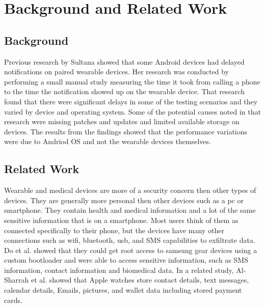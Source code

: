 \section{Background and Related Work}
\subsection{Background}
Previous research by Sultana\cite{sultana_wearable_nodate} showed that some Android devices had delayed notifications on paired wearable devices. 
Her research was conducted by performing a small manual study measuring the time it took from calling a phone to the time the notification showed up on the wearable device.
That research found that there were significant delays in some of the testing scenarios and they varied by device and operating system.
Some of the potential causes noted in that research were missing patches and updates and limited available storage on devices.
The results from the findings showed that the performance variations were due to Andriod OS and not the wearable devices themselves.

\subsection{Related Work}
Wearable and medical devices are more of a security concern then other types of devices. 
They are generally more personal then other devices such as a pc or smartphone. 
They contain health and medical information and a lot of the same sensitive information that is on a smartphone. 
Most users think of them as connected specifically to their phone, but the devices have many other connections such as wifi, bluetooth, usb, and SMS capabilities to exfiltrate data.
Do et al. showed that they could get root access to samsung gear devices using a custom bootloader and were able to access sensitive information, such as SMS information, contact information and biomedical data.\cite{do_is_2017}
In a related study, Al-Sharrah et al. showed that Apple watches store contact details, text messages, calendar details, Emails, pictures, and wallet data including stored payment cards.\cite{al-sharrah_watch_2018}